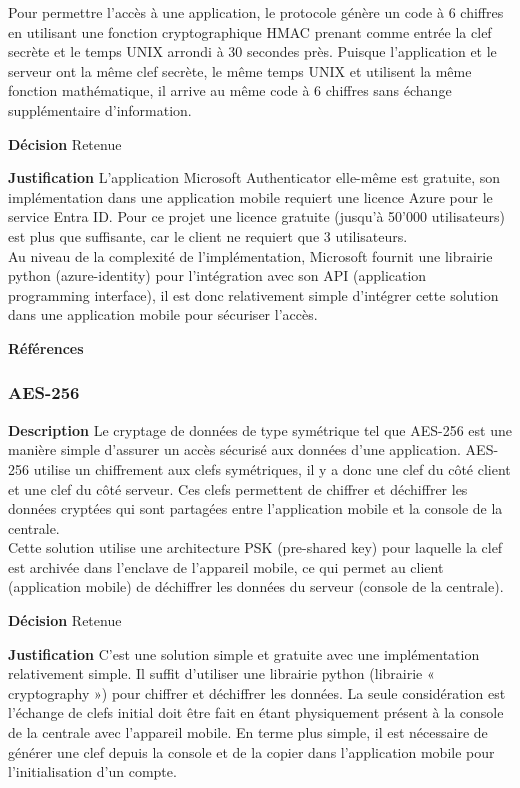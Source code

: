 Pour permettre l’accès à une application, le protocole génère un code à 6 chiffres en utilisant une fonction cryptographique HMAC prenant comme entrée la clef secrète et le temps UNIX arrondi à 30 secondes près. Puisque l’application et le serveur ont la même clef secrète, le même temps UNIX et utilisent la même fonction mathématique, il arrive au même code à 6 chiffres sans échange supplémentaire d’information.
\smallskip

\noindent\textbf{Décision} Retenue
\smallskip

\noindent\textbf{Justification} L’application Microsoft Authenticator elle-même est gratuite, son implémentation dans une application mobile requiert une licence Azure pour le service Entra ID. Pour ce projet une licence gratuite (jusqu’à 50'000 utilisateurs) est plus que suffisante, car le client ne requiert que 3 utilisateurs. 
\\

Au niveau de la complexité de l’implémentation, Microsoft fournit une librairie python (azure-identity) pour l’intégration avec son API (application programming interface), il est donc relativement simple d’intégrer cette solution dans une application mobile pour sécuriser l’accès.
\smallskip

\noindent\textbf{Références}
\cite{Authentificator1}
\cite{Authentificator2}
\cite{Authentificator3}
\cite{Authentificator4}


\subsubsection{AES-256}
\label{sec:aes25}
\noindent\textbf{Description} Le cryptage de données de type symétrique tel que AES-256 est une manière simple d’assurer un accès sécurisé aux données d’une application. AES-256 utilise un chiffrement aux clefs symétriques, il y a donc une clef du côté client et une clef du côté serveur. Ces clefs permettent de chiffrer et déchiffrer les données cryptées qui sont partagées entre l’application mobile et la console de la centrale. \\

Cette solution utilise une architecture PSK (pre-shared key) pour laquelle la clef est archivée dans l’enclave de l’appareil mobile, ce qui permet au client (application mobile) de déchiffrer les données du serveur (console de la centrale).
\smallskip

\noindent\textbf{Décision} Retenue
\smallskip

\noindent\textbf{Justification} C’est une solution simple et gratuite avec une implémentation relativement simple. Il suffit d’utiliser une librairie python (librairie « cryptography ») pour chiffrer et déchiffrer les données. La seule considération est l’échange de clefs initial doit être fait en étant physiquement présent à la console de la centrale avec l’appareil mobile. En terme plus simple, il est nécessaire de générer une clef depuis la console et de la copier dans l’application mobile pour l’initialisation d’un compte.
\smallskip

